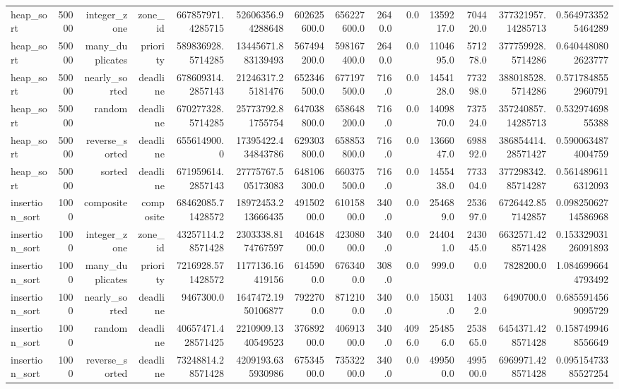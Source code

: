 \begin{table}[htbp]
\begin{tabular}{lrrrrrrrrrrrrr}
heap_sort & 50000 & integer_zone & zone_id & 667857971.4285715 & 52606356.94288648 & 602625600.0 & 656227600.0 & 2640.0 & 0.0 & 1359217.0 & 704420.0 & 377321957.14285713 & 0.5649733525464289 \\
heap_sort & 50000 & many_duplicates & priority & 589836928.5714285 & 13445671.883139493 & 567494200.0 & 598167400.0 & 2640.0 & 0.0 & 1104695.0 & 571278.0 & 377759928.5714286 & 0.6404480802623777 \\
heap_sort & 50000 & nearly_sorted & deadline & 678609314.2857143 & 21246317.25181476 & 652346500.0 & 677197500.0 & 716.0 & 0.0 & 1454128.0 & 773298.0 & 388018528.5714286 & 0.5717848552960791 \\
heap_sort & 50000 & random & deadline & 670277328.5714285 & 25773792.81755754 & 647038800.0 & 658648200.0 & 716.0 & 0.0 & 1409870.0 & 737524.0 & 357240857.14285713 & 0.53297469855388 \\
heap_sort & 50000 & reverse_sorted & deadline & 655614900.0 & 17395422.434843786 & 629303800.0 & 658853800.0 & 716.0 & 0.0 & 1366047.0 & 698892.0 & 386854414.28571427 & 0.5900634874004759 \\
heap_sort & 50000 & sorted & deadline & 671959614.2857143 & 27775767.505173083 & 648106300.0 & 660375500.0 & 716.0 & 0.0 & 1455438.0 & 773304.0 & 377298342.85714287 & 0.5614896116312093 \\
insertion_sort & 1000 & composite & composite & 68462085.71428572 & 18972453.213666435 & 49150200.0 & 61015800.0 & 340.0 & 0.0 & 254689.0 & 253697.0 & 6726442.857142857 & 0.09825062714586968 \\
insertion_sort & 1000 & integer_zone & zone_id & 43257114.28571428 & 2303338.8174767597 & 40464800.0 & 42308000.0 & 340.0 & 0.0 & 244041.0 & 243045.0 & 6632571.428571428 & 0.15332903126091893 \\
insertion_sort & 1000 & many_duplicates & priority & 7216928.571428572 & 1177136.16419156 & 6145900.0 & 6763400.0 & 308.0 & 0.0 & 999.0 & 0.0 & 7828200.0 & 1.0846996644793492 \\
insertion_sort & 1000 & nearly_sorted & deadline & 9467300.0 & 1647472.1950106877 & 7922700.0 & 8712100.0 & 340.0 & 0.0 & 15031.0 & 14032.0 & 6490700.0 & 0.6855914569095729 \\
insertion_sort & 1000 & random & deadline & 40657471.428571425 & 2210909.1340549523 & 37689200.0 & 40691300.0 & 340.0 & 4096.0 & 254856.0 & 253865.0 & 6454371.428571428 & 0.1587499468556649 \\
insertion_sort & 1000 & reverse_sorted & deadline & 73248814.28571428 & 4209193.635930986 & 67534500.0 & 73532200.0 & 340.0 & 0.0 & 499500.0 & 499500.0 & 6969971.428571428 & 0.09515473385527254 \\

\end{tabular}
\end{table}
